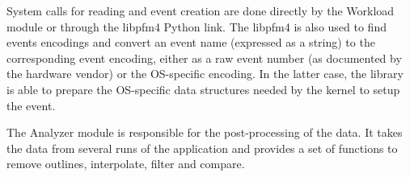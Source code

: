 System calls for reading and event creation are done directly by the Workload module or through the libpfm4 Python link. 
The libpfm4 is also used to find events encodings and convert an event name (expressed as a string) to the corresponding event encoding, either as a raw event number (as documented by the hardware vendor) or the OS-specific encoding.
In the latter case, the library is able to prepare the OS-specific data structures needed by the kernel to setup the event.

The Analyzer module is responsible for the post-processing of the data. 
It takes the data from several runs of the application and provides a set of functions to remove outlines, interpolate, filter and compare.
